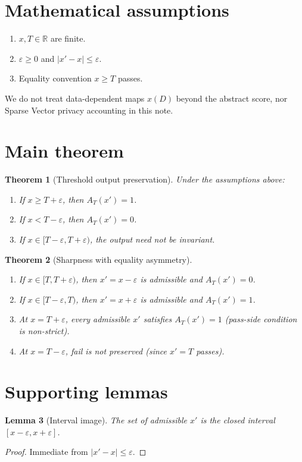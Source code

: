 \documentclass[11pt]{article}
\newtheorem{theorem}{Theorem}
\newtheorem{lemma}[theorem]{Lemma}
\begin{document}
\section{Mathematical assumptions}
\begin{enumerate}
\item \(x,T\in\mathbb{R}\) are finite.
\item \(\varepsilon\ge 0\) and \(\lvert x'-x\rvert\le\varepsilon\).
\item Equality convention \(x\ge T\) passes.
\end{enumerate}
We do not treat data-dependent maps \(x(D)\) beyond the abstract score,
nor Sparse Vector privacy accounting in this note.

\section{Main theorem}
\begin{theorem}[Threshold output preservation]\label{thm:main}
Under the assumptions above:
\begin{enumerate}
\item If \(x\ge T+\varepsilon\), then \(A_T(x')=1\).
\item If \(x<T-\varepsilon\), then \(A_T(x')=0\).
\item If \(x\in[T-\varepsilon,T+\varepsilon)\), the output need not be invariant.
\end{enumerate}
\end{theorem}

\begin{theorem}[Sharpness with equality asymmetry]\label{thm:sharp}
\begin{enumerate}
\item If \(x\in[T,T+\varepsilon)\), then \(x'=x-\varepsilon\) is admissible and
\(A_T(x')=0\).
\item If \(x\in[T-\varepsilon,T)\), then \(x'=x+\varepsilon\) is admissible and
\(A_T(x')=1\).
\item At \(x=T+\varepsilon\), every admissible \(x'\) satisfies \(A_T(x')=1\)
(pass-side condition is non-strict).
\item At \(x=T-\varepsilon\), fail is \emph{not} preserved (since \(x'=T\) passes).
\end{enumerate}
\end{theorem}

\section{Supporting lemmas}
\begin{lemma}[Interval image]\label{lem:interval}
The set of admissible \(x'\) is the closed interval \([x-\varepsilon,x+\varepsilon]\).
\end{lemma}
\begin{proof}
Immediate from \(\lvert x'-x\rvert\le\varepsilon\).
\end{proof}
\end{document}
